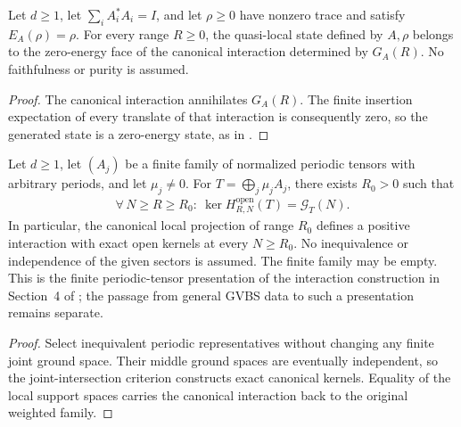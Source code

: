 \begin{lemma}
    \label{thm:canonical_parent_generated_state}
    \leanok
    Let $d\geq1$, let $\sum_iA_i^*A_i=I$, and let $\rho\geq0$ have
    nonzero trace and satisfy $E_A(\rho)=\rho$. For every range $R\geq0$,
    the quasi-local state defined by $A,\rho$ belongs to the zero-energy
    face of the canonical interaction determined by $G_A(R)$.
    No faithfulness or purity is assumed.
\end{lemma}
\begin{proof}\leanok
    The canonical interaction annihilates $G_A(R)$. The finite insertion
    expectation of every translate of that interaction is consequently zero,
    so the generated state is a zero-energy state, as in
    \cite[Lemma existenceinteraction]{Nachtergaele1996Spectral}.
\end{proof}

\begin{lemma}
    \label{thm:periodic_family_canonical_interaction}
    \leanok
    Let $d\ge1$, let $(A_j)$ be a finite family of normalized periodic
    tensors with arbitrary periods, and let $\mu_j\ne0$.
    For $T=\bigoplus_j\mu_jA_j$, there exists $R_0>0$ such that
    \begin{align}
        \forall\,N\ge R\ge R_0:\ \ker H_{R,N}^{\mathrm{open}}(T)=\mathcal G_T(N).
    \end{align}
    In particular, the canonical local projection of range $R_0$ defines
    a positive interaction with exact open kernels at every $N\ge R_0$.
    No inequivalence or independence of the given sectors is assumed.
    The finite family may be empty. This is the finite periodic-tensor
    presentation of the interaction construction in Section~4 of
    \cite{Nachtergaele1996Spectral}; the passage from general GVBS data to such a
    presentation remains separate.
\end{lemma}
\begin{proof}\leanok
    Select inequivalent periodic representatives without changing any
    finite joint ground space. Their middle ground spaces are eventually
    independent, so the joint-intersection criterion constructs exact
    canonical kernels. Equality of the local support spaces carries
    the canonical interaction back to the original weighted family.
\end{proof}

